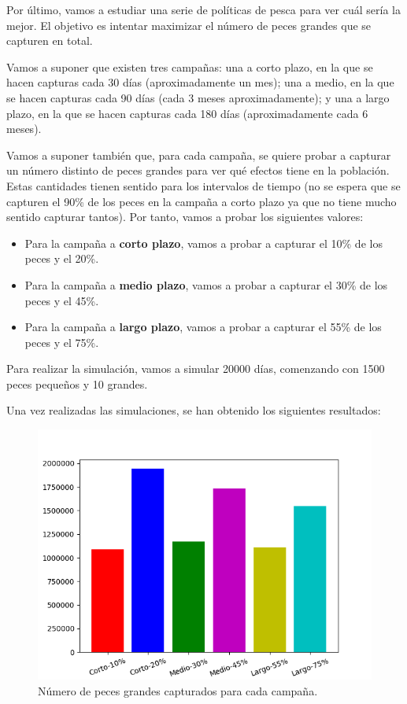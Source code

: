 \documentclass[11pt,a4paper]{report}
\begin{document}
Por último, vamos a estudiar una serie de políticas de pesca para ver cuál sería la mejor. El objetivo es intentar
maximizar el número de peces grandes que se capturen en total.

Vamos a suponer que existen tres campañas: una a corto plazo, en la que se hacen capturas cada 30 días (aproximadamente un mes);
una a medio, en la que se hacen capturas cada 90 días (cada 3 meses aproximadamente); y una a largo plazo, en la que se hacen
capturas cada 180 días (aproximadamente cada 6 meses).

Vamos a suponer también que, para cada campaña, se quiere probar a capturar un número distinto de peces grandes para ver qué
efectos tiene en la población. Estas cantidades tienen sentido para los intervalos de tiempo (no se espera que se capturen
el 90\% de los peces en la campaña a corto plazo ya que no tiene mucho sentido capturar tantos). Por tanto, vamos a probar
los siguientes valores:

\begin{itemize}
	\item Para la campaña a \textbf{corto plazo}, vamos a probar a capturar el 10\% de los peces y el 20\%.
	\item Para la campaña a \textbf{medio plazo}, vamos a probar a capturar el 30\% de los peces y el 45\%.
	\item Para la campaña a \textbf{largo plazo}, vamos a probar a capturar el 55\% de los peces y el 75\%.
\end{itemize}

Para realizar la simulación, vamos a simular 20000 días, comenzando con 1500 peces pequeños y 10 grandes.

Una vez realizadas las simulaciones, se han obtenido los siguientes resultados:

\begin{figure}[H]
\centering
\includegraphics[scale=0.43]{img/campanas.png}
\caption{Número de peces grandes capturados para cada campaña.}
\label{fig:campaigns}
\end{figure}
\end{document}
